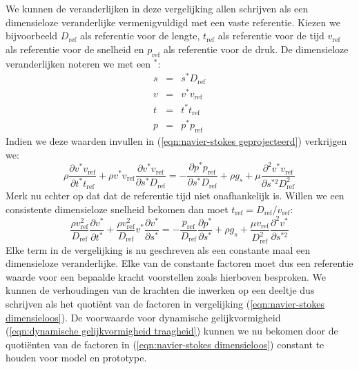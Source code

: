 We kunnen de veranderlijken in deze vergelijking allen schrijven als een dimensieloze veranderlijke vermenigvuldigd met een vaste referentie. Kiezen we bijvoorbeeld $D_{\text{ref}}$ als referentie voor de lengte, $t_{\text{ref}}$ als referentie voor de tijd  $v_{\text{ref}}$ als referentie voor de snelheid en $p_{\text{ref}}$ als referentie voor de druk. De dimensieloze veranderlijken noteren we met een $^*$: 
\begin{eqnarray}
	s &=& s^* D_{\text{ref}} \nonumber \\
	v &=& v^* v_{\text{ref}}  \\
	t &=& t^* t_{\text{ref}} \nonumber \\
	p &=& p^* p_{\text{ref}} \nonumber
	\label{eqn:referentie grootheden}
\end{eqnarray}
Indien we deze waarden invullen in (\ref{eqn:navier-stokes geprojecteerd}) verkrijgen we:
\begin{equation}
	\rho \frac{\partial v^* v_{\text{ref}}}{\partial t^* t_{\text{ref}}} + \rho v^* v_{\text{ref}} \frac{\partial v^* v_{\text{ref}}}{\partial s^* D_{\text{ref}}} = -\frac{\partial p^* p_{\text{ref}}}{\partial s^*D_{\text{ref}}} + \rho g_s + \mu \frac{\partial^2 v^* v_{\text{ref}}}{\partial s^{*2} D_{\text{ref}}^2}
\end{equation}
Merk nu echter op dat dat de referentie tijd niet onafhankelijk is. Willen we een consistente dimensieloze snelheid bekomen dan moet $t_{\text{ref}} = D_{\text{ref}}/v_{\text{ref}}$:
\begin{equation}
	\frac{\rho v_{\text{ref}}^2}{D_{\text{ref}}} \frac{\partial v^*}{\partial t^*} + \frac{\rho v_{\text{ref}}^2}{D_{\text{ref}}}v^* \frac{\partial v^*}{\partial s^*} = -\frac{p_{\text{ref}}}{D_{\text{ref}}} \frac{\partial p^*}{\partial s^*} + \rho g_s + \frac{\mu v_{\text{ref}}}{D_{\text{ref}}^2} \frac{\partial^2 v^*}{\partial s^{*2}}
	\label{eqn:navier-stokes dimensieloos}
\end{equation}
Elke term in de vergelijking is nu geschreven als een constante maal een dimensieloze veranderlijke. Elke van de constante factoren moet dus een referentie waarde voor een bepaalde kracht voorstellen zoals hierboven besproken. We kunnen de verhoudingen van de krachten die inwerken op een deeltje dus schrijven als het quotiënt van de factoren in vergelijking (\ref{eqn:navier-stokes dimensieloos}). De voorwaarde voor dynamische gelijkvormigheid (\ref{eqn:dynamische gelijkvormigheid traagheid}) kunnen we nu bekomen door de quotiënten van de factoren in (\ref{eqn:navier-stokes dimensieloos}) constant te houden voor model en prototype.

